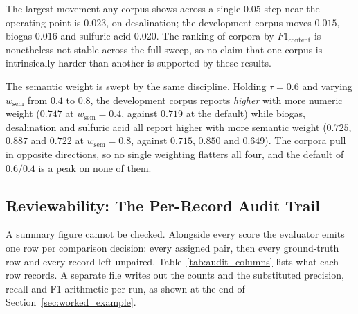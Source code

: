 \documentclass[11pt]{article}
\begin{document}
The largest movement any corpus shows across a single $0.05$ step near the
operating point is $0.023$, on desalination; the development corpus moves
$0.015$, biogas $0.016$ and sulfuric acid $0.020$. The ranking of corpora
by $F1_{\text{content}}$ is nonetheless not stable across the full sweep, so no
claim that one corpus is intrinsically harder than another is supported by these
results.

The semantic weight is swept by the same discipline. Holding $\tau = 0.6$ and
varying $w_{\text{sem}}$ from $0.4$ to $0.8$, the development corpus reports
\emph{higher} with more numeric weight ($0.747$ at $w_{\text{sem}} = 0.4$,
against $0.719$ at the default) while biogas, desalination and sulfuric acid all
report higher with more semantic weight ($0.725$, $0.887$ and $0.722$ at
$w_{\text{sem}} = 0.8$, against $0.715$, $0.850$ and $0.649$). The corpora pull
in opposite directions, so no single weighting flatters all four, and the
default of $0.6/0.4$ is a peak on none of them.

\subsection{Reviewability: The Per-Record Audit Trail}
\label{sec:audit_trail}
A summary figure cannot be checked. Alongside every score the evaluator emits one
row per comparison decision: every assigned pair, then every ground-truth row
and every record left unpaired. Table~\ref{tab:audit_columns} lists what each row
records. A separate file writes out the counts and the substituted precision,
recall and F1 arithmetic per run, as shown at the end of
Section~\ref{sec:worked_example}.
\end{document}
